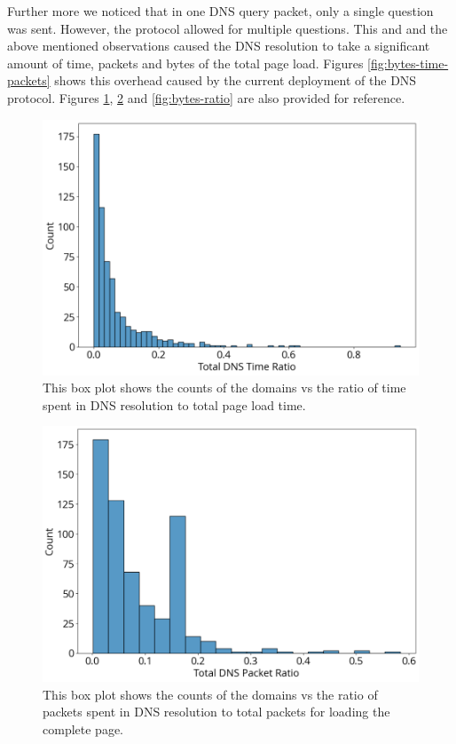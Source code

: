 \documentclass[conference]{IEEEtran}
\begin{document}
Further more we noticed that in one DNS query packet, only a single question was sent. However, the protocol allowed for multiple questions. This and and the above mentioned observations caused the DNS resolution to take a significant amount of time, packets and bytes of the total page load. Figures \ref{fig:bytes-time-packets} shows this overhead caused by the current deployment of the DNS protocol. Figures \ref{fig:time-ratio}, \ref{fig:packet-ratio} and \ref{fig:bytes-ratio} are also provided for reference.

\begin{figure}[htbp]
    \centering
    \includegraphics[width=0.9\linewidth]{images/time-ratio.png}
    \caption{This box plot shows the counts of the domains vs the ratio of time spent in DNS resolution to total page load time.}
    \label{fig:time-ratio}
\end{figure}

\begin{figure}[htbp]
    \centering
    \includegraphics[width=0.9\linewidth]{images/packet-ratio.png}
    \caption{This box plot shows the counts of the domains vs the ratio of packets spent in DNS resolution to total packets for loading the complete page.}
    \label{fig:packet-ratio}
\end{figure}
\end{document}
